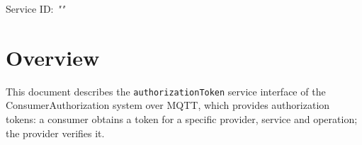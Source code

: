 \documentclass[a4paper]{arrowhead}
\begin{document}
\sloppy

\ArrowheadSetup

\begin{center}
  \vspace*{1cm}
  \huge{\arrowtitle}

  \vspace*{0.2cm}
  \LARGE{\arrowtype}
  \vspace*{1cm}

  \Large{Service ID: \textit{"\arrowid"}}

  \vspace*{\fill}


  \vspace*{1cm}
  \vspace*{\fill}

  \begin{abstract}
    This document describes the MQTT protocol with TLS payload security and JSON payload encoding variant of the \texttt{authorizationToken} service of the ConsumerAuthorization system.
  \end{abstract}

  \vspace*{1cm}
\end{center}

\newpage

\tableofcontents
\newpage

\section{Overview}
\label{sec:overview}

This document describes the \texttt{authorizationToken} service interface of the ConsumerAuthorization system over MQTT, which provides authorization tokens: a consumer obtains a token for a specific provider, service and operation; the provider verifies it.
\end{document}
